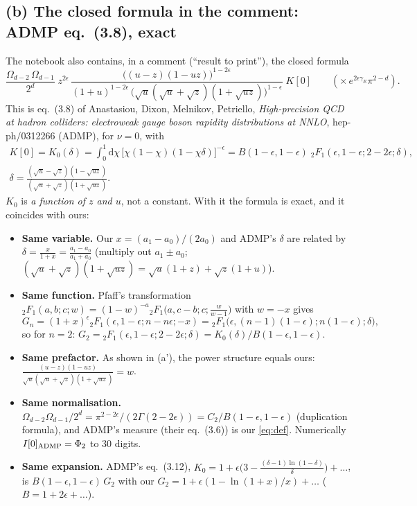 \documentclass[11pt,a4paper]{article}
\newcommand{\ep}{\epsilon}
\newcommand{\dd}{\mathrm{d}}
\newcommand{\F}{{}_2F_1}
\begin{document}
\subsection{(b) The closed formula in the comment: ADMP eq.~(3.8), exact}
The notebook also contains, in a comment (``result to print''), the closed formula
\[
  \frac{\Omega_{d-2}\,\Omega_{d-1}}{2^d}\;z^{2\ep}\,
  \frac{\big((u-z)(1-uz)\big)^{1-2\ep}}{(1+u)^{1-2\ep}\,\big(\sqrt u(\sqrt u+\sqrt z)(1+\sqrt{uz})\big)^{1-\ep}}
  \;K[0]\qquad(\times\,e^{2\ep\gamma_E}\pi^{2-d}).
\]
This is eq.~(3.8) of Anastasiou, Dixon, Melnikov, Petriello, \emph{High-precision QCD at hadron colliders:
electroweak gauge boson rapidity distributions at NNLO}, hep-ph/0312266 (ADMP), for $\nu=0$, with
\begin{gather}
  K[0]=K_0(\delta)=\int_0^1\dd\chi\,\big[\chi(1-\chi)(1-\chi\delta)\big]^{-\ep}
  =B(1-\ep,1-\ep)\;\F(\ep,1-\ep;2-2\ep;\delta),\nonumber\\
  \delta=\frac{(\sqrt u-\sqrt z)(1-\sqrt{uz})}{(\sqrt u+\sqrt z)(1+\sqrt{uz})} .
  \label{eq:admp}
\end{gather}
$K_0$ is \emph{a function of $z$ and $u$}, not a constant. With it the formula is exact, and it coincides with ours:
\begin{itemize}
\item \textbf{Same variable.} Our $x=(a_1-a_0)/(2a_0)$ and ADMP's $\delta$ are related by
  $\delta=\frac{x}{1+x}=\frac{a_1-a_0}{a_1+a_0}$ (multiply out $a_1\pm a_0$; $(\sqrt u+\sqrt z)(1+\sqrt{uz})
  =\sqrt u(1+z)+\sqrt z(1+u)$).
\item \textbf{Same function.} Pfaff's transformation $\F(a,b;c;w)=(1-w)^{-a}\F\big(a,c-b;c;\frac{w}{w-1}\big)$ with
  $w=-x$ gives
  \begin{equation}
    G_n=(1+x)^{\ep}\F(\ep,1-\ep;n-n\ep;-x)=\F\big(\ep,(n-1)(1-\ep);n(1-\ep);\delta\big),
    \label{eq:pfaff}
  \end{equation}
  so for $n=2$: $G_2=\F(\ep,1-\ep;2-2\ep;\delta)=K_0(\delta)/B(1-\ep,1-\ep)$.
\item \textbf{Same prefactor.} As shown in (a'), the power structure equals ours:
  $\frac{(u-z)(1-uz)}{\sqrt u(\sqrt u+\sqrt z)(1+\sqrt{uz})}=w$.
\item \textbf{Same normalisation.} $\Omega_{d-2}\Omega_{d-1}/2^d=\pi^{2-2\ep}/(2\Gamma(2-2\ep))=C_2/B(1-\ep,1-\ep)$
  (duplication formula), and ADMP's measure (their eq.~(3.6)) is our \eqref{eq:def}. Numerically
  $I[0]_{\rm ADMP}=\Phi_2$ to 30 digits.
\item \textbf{Same expansion.} ADMP's eq.~(3.12), $K_0=1+\ep\big(3-\frac{(\delta-1)\ln(1-\delta)}{\delta}\big)+\dots$,
  is $B(1-\ep,1-\ep)\,G_2$ with our $G_2=1+\ep(1-\ln(1+x)/x)+\dots$ ($B=1+2\ep+\dots$).
\end{itemize}
\end{document}
